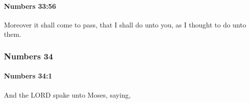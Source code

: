 		\paragraph{Numbers 33:56} %
			\label{NUMBERS-33-56}

			Moreover it shall come to pass, that I shall do unto you, as I thought to do unto them.

	\subsubsection{Numbers 34} %
		\label{NUMBERS-34}

		\paragraph{Numbers 34:1} %
			\label{NUMBERS-34-1}

			And the LORD spake unto Moses, saying,



